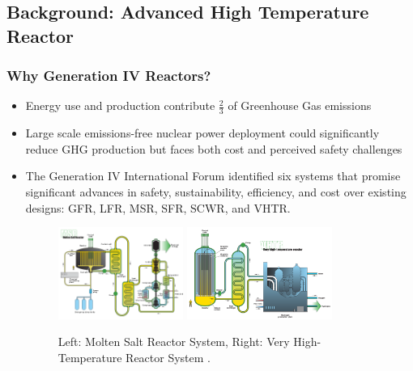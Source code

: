 \subsection{Background: Advanced High Temperature Reactor}
    \begin{frame}
        \frametitle{Why Generation IV Reactors?}
        \begin{itemize}
        \item Energy use and production contribute $\frac{2}{3}$ of Greenhouse Gas 
        emissions \cite{noauthor_climate_2018}
        \item  Large scale emissions-free nuclear power deployment could 
        significantly reduce GHG production but faces both cost and perceived 
        safety challenges 
        \item The Generation IV International Forum identified six systems 
        that promise significant advances in safety, sustainability, efficiency, 
        and cost over existing designs: GFR, LFR, MSR, SFR, SCWR, and VHTR. 
        \begin{figure}[htbp!]
            \includegraphics[height=3cm]{figures/msr}
            \hspace{1cm}
            \includegraphics[height=3cm]{figures/vhtr}
            \caption{Left: Molten Salt Reactor System, Right: Very High-Temperature
            Reactor System \cite{gif_technology_2002}. }
        \end{figure}
        \end{itemize}
    \end{frame}
